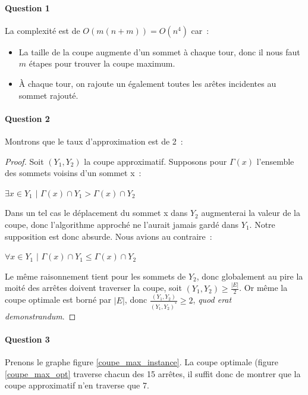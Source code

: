\paragraph{Question 1}
La complexité est de $O(m(n+m))=O(n^4)$ car~:
\begin{itemize}
\item La taille de la coupe augmente d'un sommet à chaque tour, donc
il nous faut $m$ étapes pour trouver la coupe maximum.
\item À chaque tour, on rajoute un également toutes les arêtes
incidentes au sommet rajouté.
\end{itemize}

\paragraph{Question 2}
Montrons que le taux d'approximation est de 2~:
\begin{proof}Soit $(Y_1,Y_2)$ la coupe approximatif. Supposons pour $\Gamma(x)$ l'ensemble des sommets voisins d'un sommet x~:

$\exists x \in Y_1 \text{ | } \Gamma(x) \cap Y_1 > \Gamma(x) \cap Y_2$

Dans un tel cas le déplacement du sommet x dans $Y_2$ augmenterai la valeur de la coupe, donc l'algorithme approché ne l'aurait jamais gardé dans $Y_1$. Notre supposition est donc absurde. Nous avions au contraire~:

$\forall x \in Y_1 \text{ | } \Gamma(x) \cap Y_1 \leq \Gamma(x) \cap Y_2$

Le même raisonnement tient pour les sommets de $Y_2$, donc globalement au pire la moité des arrêtes doivent traverser la coupe, soit \mbox{$(Y_1,Y_2) \geq \frac{|E|}{2}$}. Or même la coupe optimale est borné par $|E|$, donc $\frac{(Y_1,Y_2)}{(Y_1,Y_2)^*} \geq 2$, \emph{quod erat demonstrandum}.
\end{proof}

\paragraph{Question 3}

Prenons le graphe figure \ref{coupe_max_instance}. La coupe optimale (figure \ref{coupe_max_opt} traverse chacun des 15 arrêtes, il suffit donc de montrer que la coupe approximatif n'en traverse que 7. 

